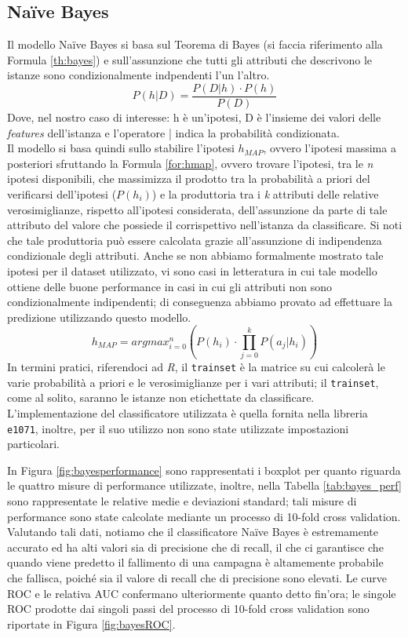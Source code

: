 \subsection{Na\"ive Bayes}
Il modello Na\"ive Bayes si basa sul Teorema di Bayes (si faccia riferimento alla Formula \ref{th:bayes}) e sull'assunzione che tutti gli attributi che descrivono le istanze sono condizionalmente indpendenti l'un l'altro.
\begin{equation}
\label{th:bayes}
P(h|D) = \frac{P(D|h) \cdot P(h)}{P(D)}
\end{equation}
Dove, nel nostro caso di interesse: h è un'ipotesi, D è l'insieme dei valori delle \textit{features} dell'istanza e l'operatore | indica la probabilità condizionata.\\
Il modello si basa quindi sullo stabilire l'ipotesi $h_{MAP}$, ovvero l'ipotesi massima a posteriori sfruttando la Formula \ref{for:hmap}, ovvero trovare l'ipotesi, tra le \textit{n} ipotesi disponibili, che massimizza il prodotto tra la probabilità a priori del verificarsi dell'ipotesi ($P(h_{i})$) e la produttoria tra i \textit{k} attributi delle relative verosimiglianze, rispetto all'ipotesi considerata, dell'assunzione da parte di tale attributo del valore che possiede il corrispettivo nell'istanza da classificare. 
Si noti che tale produttoria può essere calcolata grazie all'assunzione di indipendenza condizionale degli attributi.
Anche se non abbiamo formalmente mostrato tale ipotesi per il dataset utilizzato, vi sono casi in letteratura in cui tale modello ottiene delle buone performance in casi in cui gli attributi non sono condizionalmente indipendenti; di conseguenza abbiamo provato ad effettuare la predizione utilizzando questo modello.\\
\begin{equation}
	\label{for:hmap}
	h_{MAP} = argmax_{i = 0}^{n}\left(P(h_{i}) \cdot \prod_{j = 0}^{k}P(a_{j}|h_{i})\right)
\end{equation}
In termini pratici, riferendoci ad \emph{R}, il \texttt{trainset} è la matrice su cui calcolerà le varie probabilità a priori e le verosimiglianze per i vari attributi; il \texttt{trainset}, come al solito, saranno le istanze non etichettate da classificare.
L'implementazione del classificatore utilizzata è quella fornita nella libreria \texttt{e1071}, inoltre, per il suo utilizzo non sono state utilizzate impostazioni particolari.

In Figura \ref{fig:bayesperformance} sono rappresentati i boxplot per quanto riguarda le quattro misure di performance utilizzate, inoltre, nella Tabella \ref{tab:bayes_perf} sono rappresentate le relative medie e deviazioni standard; tali misure di performance sono state calcolate mediante un processo di 10-fold cross validation.
Valutando tali dati, notiamo che il classificatore Na\"ive Bayes è estremamente accurato ed ha alti valori sia di precisione che di recall, il che ci garantisce che quando viene predetto il fallimento di una campagna è altamemente probabile che fallisca, poiché sia il valore di recall che di precisione sono elevati.
Le curve ROC e le relativa AUC confermano ulteriormente quanto detto fin'ora; le singole ROC prodotte dai singoli passi del processo di 10-fold cross validation sono riportate in Figura \ref{fig:bayesROC}.

